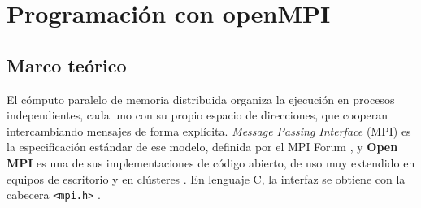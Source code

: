 
\chapter{Programación con openMPI}
\label{cap:05}

\section{Marco teórico}
\label{sec:cap05:marco}

El cómputo paralelo de memoria distribuida organiza la ejecución en procesos independientes, cada uno con su propio espacio de direcciones, que cooperan intercambiando mensajes de forma explícita. \textit{Message Passing Interface} (MPI) es la especificación estándar de ese modelo, definida por el MPI Forum \cite{mpiforum2021}, y \textbf{Open MPI} es una de sus implementaciones de código abierto, de uso muy extendido en equipos de escritorio y en clústeres \cite{openmpi2024}. En lenguaje C, la interfaz se obtiene con la cabecera \texttt{<mpi.h>} \cite{pacheco2011}.


